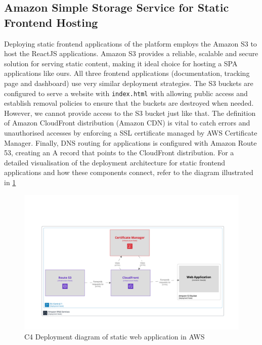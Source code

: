 \subsection{Amazon Simple Storage Service for Static Frontend Hosting}
\label{subsec:amazon-s3-static-frontend}
Deploying static frontend applications of the platform employs the Amazon \ac{S3} to host the ReactJS applications. Amazon \ac{S3} provides a reliable, scalable and secure solution for serving static content, making it ideal choice for hosting a \ac{SPA} applications like ours.
All three frontend applications (documentation, tracking page and dashboard) use very similar deployment strategies.
The \ac{S3} buckets are configured to serve a website with \texttt{index.html} with allowing public access and establish removal policies to ensure that the buckets are destroyed when needed. 
However, we cannot provide access to the \ac{S3} bucket just like that.
The definition of Amazon CloudFront distribution (Amazon \ac{CDN}) is vital to catch errors and unauthorised accesses by enforcing a \ac{SSL} certificate managed by \ac{AWS} Certificate Manager.
Finally, \ac{DNS} routing for applications is configured with Amazon Route 53, creating an A record that points to the CloudFront distribution.
For a detailed visualisation of the deployment architecture for static frontend applications and how these components connect, refer to the diagram illustrated in \ref{img06:fig_static-webapp} 


\begin{figure}[p]\centering
\includegraphics[width=140mm]{img/chap06/fig_static-webapp.png}
\caption{C4 Deployment diagram of static web application in AWS}
\label{img06:fig_static-webapp}
\end{figure}

